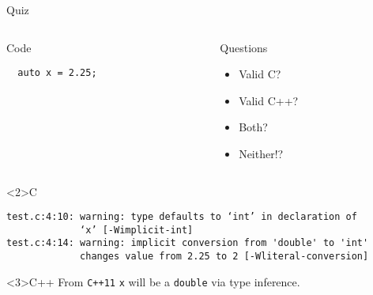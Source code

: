 \documentclass[presentation,aspectratio=169]{beamer}
\begin{document}
\begin{frame}[fragile,label={sec:org23c4234}]{Quiz}
\begin{columns}
\begin{column}{0.48\columnwidth}
\begin{block}{Code}
\begin{verbatim}
  auto x = 2.25;
\end{verbatim}
\end{block}
\end{column}

\begin{column}{0.48\columnwidth}
\begin{block}{Questions}
\begin{itemize}
\item Valid C?
\item Valid C++?
\item Both?
\item Neither!?
\end{itemize}
\end{block}
\end{column}
\end{columns}

\begin{block}<2>{C}
\begin{verbatim}
test.c:4:10: warning: type defaults to ‘int’ in declaration of
             ‘x’ [-Wimplicit-int]
test.c:4:14: warning: implicit conversion from 'double' to 'int'
             changes value from 2.25 to 2 [-Wliteral-conversion]
\end{verbatim}

\end{block}
\vspace{-3cm}
\begin{block}<3>{C++}
From \texttt{C++11} \texttt{x} will be a \texttt{double} via type inference.
\end{block}
\end{frame}

\end{document}
